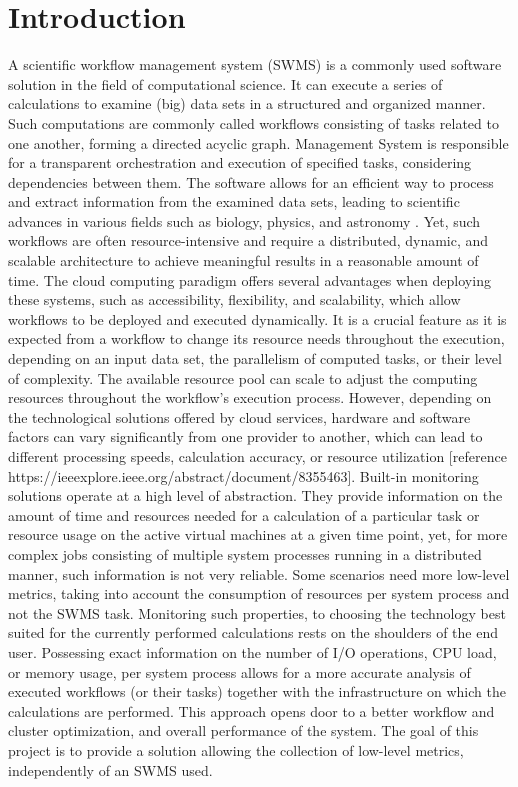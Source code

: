 \documentclass[lettersize,journal]{IEEEtran}
\begin{document}
	\section{Introduction}
	A scientific workflow management system (SWMS) is a commonly used software solution in the field of computational science. It can execute a series of calculations to examine (big) data sets in a structured and organized manner. Such computations are commonly called workflows consisting of tasks related to one another, forming a directed acyclic graph. Management System is responsible for a transparent orchestration and execution of specified tasks, considering dependencies between them. The software allows for an efficient way to process and extract information from the examined data sets, leading to scientific advances in various fields such as biology, physics, and astronomy \cite{challengesSW}. Yet, such workflows are often resource-intensive and require a distributed, dynamic, and scalable architecture to achieve meaningful results in a reasonable amount of time. The cloud computing paradigm offers several advantages when deploying these systems, such as accessibility, flexibility, and scalability, which allow workflows to be deployed and executed dynamically. It is a crucial feature as it is expected from a workflow to change its resource needs throughout the execution, depending on an input data set, the parallelism of computed tasks, or their level of complexity. The available resource pool can scale to adjust the computing resources throughout the workflow's execution process. However, depending on the technological solutions offered by cloud services, hardware and software factors can vary significantly from one provider to another, which can lead to different processing speeds, calculation accuracy, or resource utilization [reference https://ieeexplore.ieee.org/abstract/document/8355463]. Built-in monitoring solutions operate at a high level of abstraction. They provide information on the amount of time and resources needed for a calculation of a particular task or resource usage on the active virtual machines at a given time point, yet, for more complex jobs consisting of multiple system processes running in a distributed manner, such information is not very reliable. Some scenarios need more low-level metrics, taking into account the consumption of resources per system process and not the SWMS task. Monitoring such properties, to choosing the technology best suited for the currently performed calculations rests on the shoulders of the end user. Possessing exact information on the number of I/O operations, CPU load, or memory usage, per system process allows for a more accurate analysis of executed workflows (or their tasks) together with the infrastructure on which the calculations are performed. This approach opens door to a better workflow and cluster optimization, and overall performance of the system. The goal of this project is to provide a solution allowing the collection of low-level metrics, independently of an SWMS used.
\end{document}
